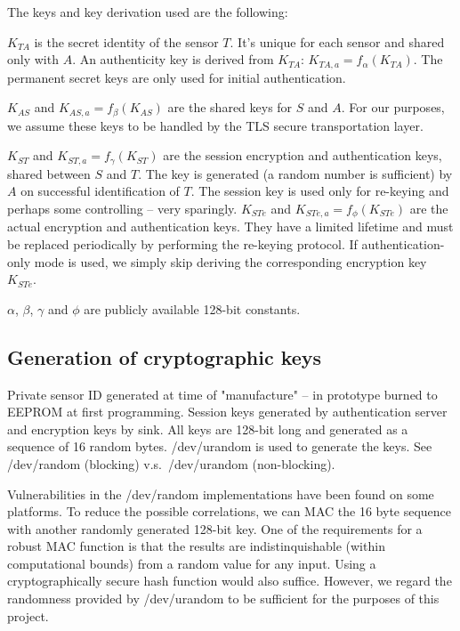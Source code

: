 The keys and key derivation used are the following:
%
\begin{description}
\item $K_{TA}$ is the secret identity of the sensor $T$. It's unique for each sensor and shared only with $A$. An authenticity key is derived from $K_{TA}$: $K_{TA,a} = f_\alpha(K_{TA})$. The permanent secret keys are only used for initial authentication.
\item $K_{AS}$ and $K_{AS,a}=f_\beta(K_{AS})$ are the shared keys for $S$ and $A$. For our purposes, we assume these keys to be handled by the TLS secure transportation layer.
\item $K_{ST}$ and $K_{ST,a}=f_\gamma(K_{ST})$ are the session encryption and authentication keys, shared between $S$ and $T$. The key is generated (a random number is sufficient) by $A$ on successful identification of $T$. The session key is used only for re-keying and perhaps some controlling -- very sparingly.
$K_{STe}$ and $K_{STe,a}=f_\phi(K_{STe})$ are the actual encryption and authentication keys. They have a limited lifetime and must be replaced periodically by performing the re-keying protocol. If authentication-only mode is used, we simply skip deriving the corresponding encryption key $K_{STe}$.
\end{description}
$\alpha$, $\beta$, $\gamma$ and $\phi$ are publicly available 128-bit constants.

\subsection{Generation of cryptographic keys}

Private sensor ID generated at time of "manufacture" -- in prototype burned to EEPROM at first programming. Session keys generated by authentication server and encryption keys by sink. All keys are 128-bit long and generated as a sequence of 16 random bytes. /dev/urandom is used to generate the keys. See /dev/random (blocking) v.s.\ /dev/urandom (non-blocking).

Vulnerabilities in the /dev/random implementations have been found on some platforms. To reduce the possible correlations, we can MAC the 16 byte sequence with another randomly generated 128-bit key. One of the requirements for a robust MAC function is that the results are indistinquishable (within computational bounds) from a random value for any input. Using a cryptographically secure hash function would also suffice. However, we regard the randomness provided by /dev/urandom to be sufficient for the purposes of this project.

%
%
